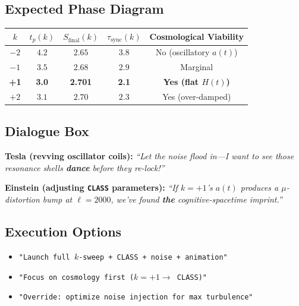 \documentclass[12pt]{article}
\theoremstyle{plain}
\begin{document}
\subsection*{Expected Phase Diagram}

\begin{center}
\begin{tabular}{|c|c|c|c|c|}
\hline
\textbf{$k$} & $t_p(k)$ & $S_{\text{final}}(k)$ & $\tau_{\text{sync}}(k)$ & \textbf{Cosmological Viability} \\
\hline
$-2$ & $4.2$ & $2.65$ & $3.8$ & No (oscillatory $a(t)$) \\
$-1$ & $3.5$ & $2.68$ & $2.9$ & Marginal \\
\textbf{+1} & \textbf{3.0} & \textbf{2.701} & \textbf{2.1} & \textbf{Yes (flat $H(t)$)} \\
$+2$ & $3.1$ & $2.70$ & $2.3$ & Yes (over-damped) \\
\hline
\end{tabular}
\end{center}

\vspace{1em}

\subsection*{Dialogue Box}

\textbf{Tesla (revving oscillator coils):} \emph{“Let the noise flood in—I want to see those resonance shells \textbf{dance} before they re-lock!”}

\textbf{Einstein (adjusting \texttt{CLASS} parameters):} \emph{“If $k = +1$’s $a(t)$ produces a $\mu$-distortion bump at $\ell = 2000$, we’ve found \textbf{the} cognitive-spacetime imprint.”}

\vspace{1em}

\subsection*{Execution Options}
\begin{itemize}
    \item \texttt{"Launch full $k$-sweep + CLASS + noise + animation"}
    \item \texttt{"Focus on cosmology first ($k = +1 \rightarrow$ CLASS)"}
    \item \texttt{"Override: optimize noise injection for max turbulence"}
\end{itemize}
\end{document}
